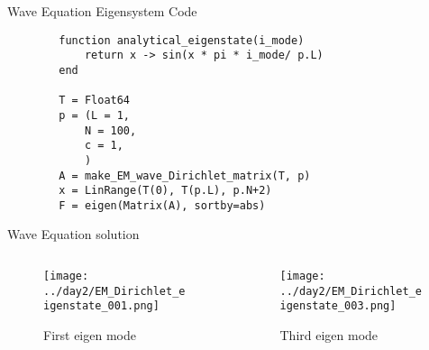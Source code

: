 \documentclass[aspectratio=169]{beamer}
\begin{document}
\begin{frame}[fragile]{Wave Equation Eigensystem Code}
    \begin{verbatim}
        function analytical_eigenstate(i_mode)
            return x -> sin(x * pi * i_mode/ p.L)
        end

        T = Float64
        p = (L = 1,
            N = 100,
            c = 1,
            )
        A = make_EM_wave_Dirichlet_matrix(T, p)
        x = LinRange(T(0), T(p.L), p.N+2)
        F = eigen(Matrix(A), sortby=abs)
    \end{verbatim}
\end{frame}

\begin{frame}{Wave Equation solution}
    \begin{columns}
        \begin{column}{0.5\textwidth}
            \centering 
            \begin{figure}
            \texttt{[image: ../day2/EM\_Dirichlet\_eigenstate\_001.png]} \\
            \caption{First eigen mode} 
            \end{figure}
        \end{column}

        \begin{column}{0.5\textwidth}
            \centering 
            \begin{figure}
            \texttt{[image: ../day2/EM\_Dirichlet\_eigenstate\_003.png]} \\
            \caption{Third eigen mode} 
            \end{figure}
        \end{column}
    \end{columns}
\end{frame}
\end{document}
